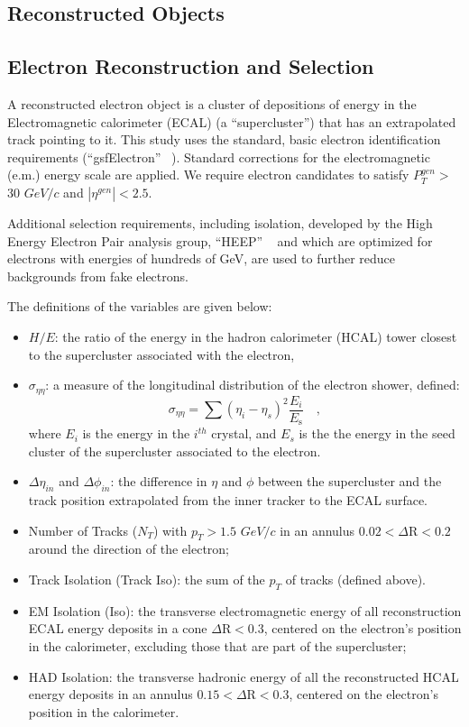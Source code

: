 \documentclass{cmspaper}
\begin{document}
\begin{linenumbers}
\section{Reconstructed Objects} 

\subsection{Electron Reconstruction and Selection} \label{sec:electrons}
A reconstructed electron object is a cluster of depositions 
of energy in the Electromagnetic calorimeter (ECAL) (a ``supercluster'') that has an 
extrapolated track pointing to it. This study uses the standard, basic electron
identification requirements (``gsfElectron'' ~\cite{GSFele}).
Standard corrections  for
the electromagnetic (e.m.) energy scale are applied.
We require electron candidates to satisfy $P_{T}^{gen}>$ 30 $GeV/c$ 
and $|\eta^{gen}|<2.5$. 

Additional selection requirements, including isolation,
developed by the High Energy Electron Pair
 analysis group, ``HEEP'' ~\cite{HEEPNOTE} and which are optimized for 
electrons with energies of hundreds of GeV,
are used to further reduce backgrounds
from fake electrons.

The definitions of the variables are given below:
%
\begin{itemize}
%
\item $H/E$: the ratio of the energy in the hadron calorimeter (HCAL)
tower closest 
 to the supercluster associated with the electron,
%
\item $\sigma_{\eta\eta}$: a measure of 
the longitudinal distribution of the electron shower, defined:
\begin{displaymath}
\sigma_{\eta\eta} = \sum( \eta_i - \eta_s )^2 \frac{E_i}{E_{\mbox{s}}} \quad ,
\end{displaymath}
where $E_i$ is the energy in the $i^{th}$ crystal, and $E_s$ is the the energy in the seed cluster of the supercluster associated to the electron.
%
\item $\Delta\eta_{in}$ and $\Delta\phi_{in}$: the difference in $\eta$ and $\phi$ between the supercluster and the track position extrapolated from 
the inner tracker to the ECAL surface.
%
\item Number of Tracks ($N_T$) with $p_{T}>1.5$ $GeV/c$ in an annulus $0.02 < \Delta\mbox{R} < 0.2 $ around the direction of the electron;
%
\item Track Isolation (Track Iso): the sum of the $p_{T}$ of tracks (defined above).
%
%
\item EM Isolation (Iso): the transverse electromagnetic energy 
of all reconstruction ECAL energy deposits
in a cone $\Delta\mbox{R} < 0.3$, 
centered on the electron's position in the calorimeter, excluding those
that are part of the supercluster;
%
\item HAD Isolation: the transverse  hadronic energy of all the 
reconstructed HCAL energy deposits in an annulus
$0.15 < \Delta\mbox{R} < 0.3$, centered on the electron's position in the calorimeter. 
%
\end{itemize}


\end{linenumbers}
\end{document}
